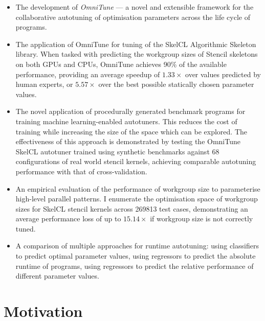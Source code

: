 \begin{itemize}
\item The development of \emph{OmniTune} --- a novel and extensible
  framework for the collaborative autotuning of optimisation
  parameters across the life cycle of programs.
\item The application of OmniTune for tuning of the SkelCL Algorithmic
  Skeleton library. When tasked with predicting the workgroup sizes of
  Stencil skeletons on both GPUs and CPUs, OmniTune achieves 90\% of
  the available performance, providing an average speedup of
  $1.33\times$ over values predicted by human experts, or $5.57\times$
  over the best possible statically chosen parameter values.
\item The novel application of procedurally generated benchmark
  programs for training machine learning-enabled autotuners. This
  reduces the cost of training while increasing the size of the space
  which can be explored. The effectiveness of this approach is
  demonstrated by testing the OmniTune SkelCL autotuner trained using
  synthetic benchmarks against 68 configurations of real world stencil
  kernels, achieving comparable autotuning performance with that of
  cross-validation.
\item An empirical evaluation of the performance of workgroup size to
  parameterise high-level parallel patterns. I enumerate the
  optimisation space of workgroup sizes for SkelCL stencil kernels
  across 269813 test cases, demonstrating an average performance loss
  of up to $15.14\times$ if workgroup size is not correctly tuned.
\item A comparison of multiple approaches for runtime autotuning:
  using classifiers to predict optimal parameter values, using
  regressors to predict the absolute runtime of programs, using
  regressors to predict the relative performance of different
  parameter values.
\end{itemize}


\section{Motivation}

